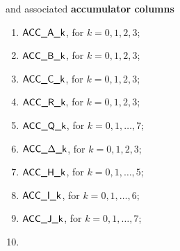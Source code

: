 \noindent and associated \textbf{accumulator columns}
\begin{multicols}{2}
\begin{enumerate}[resume]\setcounter{enumi}{\value{alu_ext_counter}}
	\item $\textsf{ACC}\textsf{\_A\_k}$, for $k=0,1,2,3$;
	\item $\textsf{ACC}\textsf{\_B\_k}$, for $k=0,1,2,3$;
	\item $\textsf{ACC}\textsf{\_C\_k}$, for $k=0,1,2,3$;
	\item $\textsf{ACC}\textsf{\_R\_k}$, for $k=0,1,2,3$;
	\item $\textsf{ACC}\textsf{\_Q\_k}$, for $k=0,1,\dots,7$;
	\item $\textsf{ACC}\textsf{\_$\Delta$\_k}$, for $k=0,1,2,3$;
	\item $\textsf{ACC}\textsf{\_H\_k}$, for $k=0,1,\dots,5$;
	\item $\textsf{ACC}\textsf{\_I\_k}$, for $k=0,1,\dots,6$;
	\item $\textsf{ACC}\textsf{\_J\_k}$, for $k=0,1,\dots,7$;
	\setcounter{alu_ext_counter}{\value{enumi}}
	\item[\vspace{\fill}]
\end{enumerate}
\end{multicols}
